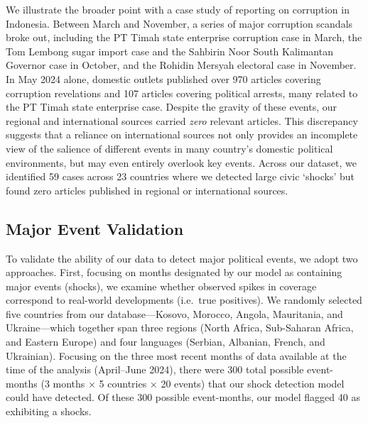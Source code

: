 \documentclass[
  letterpaper,
  DIV=11,
  numbers=noendperiod]{scrartcl}
\begin{document}
We illustrate the broader point with a case study of reporting on
corruption in Indonesia. Between March and November, a series of major
corruption scandals broke out, including the PT Timah state enterprise
corruption case in March, the Tom Lembong sugar import case and the
Sahbirin Noor South Kalimantan Governor case in October, and the Rohidin
Mersyah electoral case in November. In May 2024 alone, domestic outlets
published over 970 articles covering corruption revelations and 107
articles covering political arrests, many related to the PT Timah state
enterprise case. Despite the gravity of these events, our regional and
international sources carried \emph{zero} relevant articles. This
discrepancy suggests that a reliance on international sources not only
provides an incomplete view of the salience of different events in many
country's domestic political environments, but may even entirely
overlook key events. Across our dataset, we identified 59 cases across
23 countries where we detected large civic `shocks' but found zero
articles published in regional or international sources.

\hypertarget{major-event-validation}{%
\subsection{Major Event Validation}\label{major-event-validation}}

To validate the ability of our data to detect major political events, we
adopt two approaches. First, focusing on months designated by our model
as containing major events (shocks), we examine whether observed spikes
in coverage correspond to real-world developments (i.e.~true positives).
We randomly selected five countries from our database---Kosovo, Morocco,
Angola, Mauritania, and Ukraine---which together span three regions
(North Africa, Sub-Saharan Africa, and Eastern Europe) and four
languages (Serbian, Albanian, French, and Ukrainian). Focusing on the
three most recent months of data available at the time of the analysis
(April--June 2024), there were 300 total possible event-months (3 months
× 5 countries × 20 events) that our shock detection model could have
detected. Of these 300 possible event-months, our model flagged 40 as
exhibiting a shocks.
\end{document}
